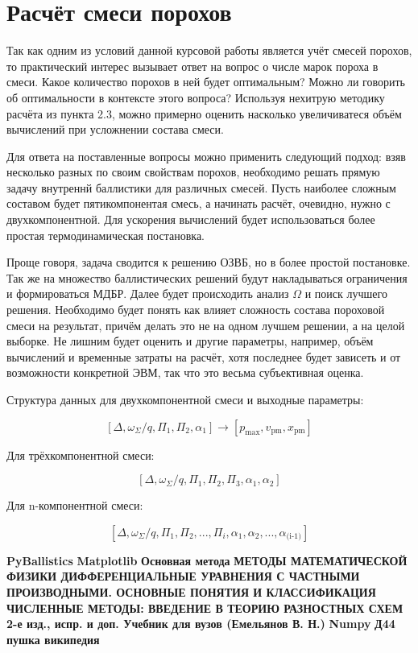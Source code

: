 \documentclass[14pt, a4paper]{extreport} %
\begin{document}
\section{Расчёт смеси порохов}

Так как одним из условий данной курсовой работы является учёт смесей порохов, то практический интерес вызывает ответ на вопрос о числе марок пороха в смеси. Какое количество порохов в ней будет оптимальным? Можно ли говорить об оптимальности в контексте этого вопроса?
Используя нехитрую методику расчёта из пункта 2.3, можно примерно оценить насколько увеличиватеся объём вычислений при усложнении состава смеси. 

Для ответа на поставленные вопросы можно применить следующий подход: взяв несколько разных по своим свойствам порохов, необходимо решать прямую задачу внутреннй баллистики 
для различных смесей. Пусть наиболее сложным составом будет пятикомпонентая смесь, а начинать расчёт, очевидно, нужно с двухкомпонентной. Для ускорения вычислений будет использоваться более простая термодинамическая постановка.

Проще говоря, задача сводится к решению ОЗВБ, но в более простой постановке. Так же на множество баллистических решений будут накладываться ограничения и формироваться МДБР. Далее будет происходить 
анализ $\Omega $ и поиск лучшего решения. Необходимо будет понять как влияет сложность состава пороховой смеси на результат, причём делать это не на одном лучшем решении, а на целой выборке. Не лишним будет 
оценить и другие параметры, например, объём вычислений и временные затраты на расчёт, хотя последнее будет зависеть и от возможности конкретной ЭВМ, так что это весьма субъективная оценка.

Структура данных для двухкомпонентной смеси и выходные параметры: 

\[
 [\varDelta, \omega_\Sigma / q,  \Pi_1, \Pi_2, \alpha_1] \longrightarrow [p_{\text{max}}, v_{\text{pm}}, x_{\text{pm}}]
\]

Для трёхкомпонентной смеси: 

\[
 [\varDelta, \omega_\Sigma / q,  \Pi_1, \Pi_2,\Pi_3,\alpha_1, \alpha_2] 
\]

Для n-компонентной смеси: 

\[
 [\varDelta, \omega_\Sigma / q,  \Pi_1, \Pi_2,...,\Pi_i, \alpha_1, \alpha_2,...,\alpha_{\text{(i-1)}} ] 
\]

\newpage
\begin{thebibliography}{9}
\bibitem{} \textbf{PyBallistics}
\bibitem{} \textbf{Matplotlib} 
\bibitem{} \textbf{Основная метода} 
\bibitem{} \textbf{МЕТОДЫ МАТЕМАТИЧЕСКОЙ ФИЗИКИ 
ДИФФЕРЕНЦИАЛЬНЫЕ УРАВНЕНИЯ 
С ЧАСТНЫМИ ПРОИЗВОДНЫМИ. 
ОСНОВНЫЕ ПОНЯТИЯ И КЛАССИФИКАЦИЯ } 
\bibitem{} \textbf{ЧИСЛЕННЫЕ МЕТОДЫ: ВВЕДЕНИЕ В ТЕОРИЮ РАЗНОСТНЫХ СХЕМ 2-е изд., испр. и доп. Учебник для вузов (Емельянов В. Н.)} 
\bibitem{} \textbf{Numpy}
\bibitem{} \textbf{Д44 пушка википедия}
\end{thebibliography}
\end{document}
